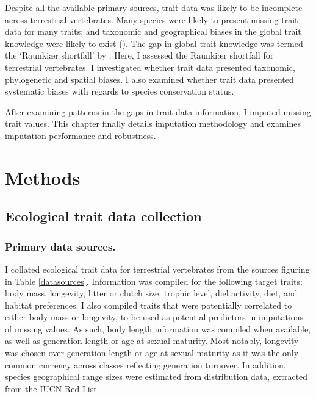 Despite all the available primary sources, trait data was likely to be incomplete across terrestrial vertebrates. Many species were likely to present missing trait data for many traits; and taxonomic and geographical biases in the global trait knowledge were likely to exist (\cite{Hortal2014}). The gap in global trait knowledge was termed the `Raunki{\ae}r shortfall' by \cite{Hortal2014}. Here, I assessed the Raunki{\ae}r shortfall for terrestrial vertebrates. I investigated whether trait data presented taxonomic, phylogenetic and spatial biases. I also examined whether trait data presented systematic biases with regards to species conservation status. 

After examining patterns in the gaps in trait data information, I imputed missing trait values. This chapter finally details imputation methodology and examines imputation performance and robustness.



\section{Methods}

\subsection{Ecological trait data collection}

\subsubsection{Primary data sources.}
I collated ecological trait data for terrestrial vertebrates from the sources figuring in Table \ref{datasources}. Information was compiled for the following target traits: body mass, longevity, litter or clutch size, trophic level, diel activity, diet, and habitat preferences. I also compiled traits that were potentially correlated to either body mass or longevity, to be used as potential predictors in imputations of missing values. As such, body length information was compiled when available, as well as generation length or age at sexual maturity. Most notably, longevity was chosen over generation length or age at sexual maturity as it was the only common currency across classes reflecting generation turnover. In addition, species geographical range sizes were estimated from distribution data, extracted from the IUCN Red List.

